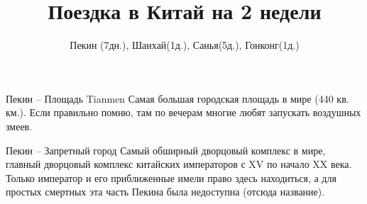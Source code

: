 \documentclass[pdf]{beamer}
\title{Поездка в Китай на 2 недели}
\subtitle{Пекин (7дн.), Шанхай(1д.), Санья(5д.), Гонконг(1д.)}
\begin{document}
\begin{frame}\titlepage\end{frame}
	\begin{frame}{Пекин -- Площадь Tianmen}
		 Самая большая городская площадь в мире (440 кв. км.). Если правильно помню, там по вечерам многие любят запускать
		 воздушных змеев.
	\end{frame}
	\begin{frame}{Пекин -- Запретный город}
		 Самый обширный дворцовый комплекс в мире, главный дворцовый комплекс китайских императоров с XV по начало XX века. 
		 Только император и его приближенные имели право здесь находиться, а для простых смертных эта часть Пекина
		 была недоступна (отсюда название).
	\end{frame}
\end{document}
